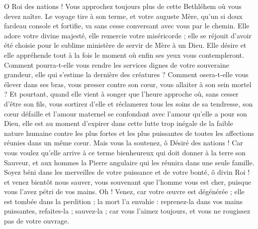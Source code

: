\documentclass[%
fontsize=10%
,a6paper%
,DIV=15%
]{scrartcl}
\begin{document}
O Roi des nations ! Vous approchez toujours plus de cette Bethléhem où vous devez naître. Le voyage tire à son terme, et votre auguste Mère, qu’un si doux fardeau console et fortifie, va sans cesse conversant avec vous par le chemin. Elle adore votre divine majesté, elle remercie votre miséricorde ; elle se réjouit d’avoir été choisie pour le sublime ministère de servir de Mère à un Dieu. Elle désire et elle appréhende tout à la fois le moment où enfin ses yeux vous contempleront. Comment pourra-t-elle vous rendre les services dignes de votre souveraine grandeur, elle qui s’estime la dernière des créatures ? Comment osera-t-elle vous élever dans ses bras, vous presser contre son cœur, vous allaiter à son sein mortel ? Et pourtant, quand elle vient à songer que l’heure approche où, sans cesser d’être son fils, vous sortirez d’elle et réclamerez tous les soins de sa tendresse, son cœur défaille et l’amour maternel se confondant avec l’amour qu’elle a pour son Dieu, elle est au moment d’expirer dans cette lutte trop inégale de la faible nature humaine contre les plus fortes et les plus puissantes de toutes les affections réunies dans un même cœur. Mais vous la soutenez, ô Désiré des nations ! Car vous voulez qu’elle arrive à ce terme bienheureux qui doit donner à la terre son Sauveur, et aux hommes la Pierre angulaire qui les réunira dans une seule famille. Soyez béni dans les merveilles de votre puissance et de votre bonté, ô divin Roi ! et venez bientôt nous sauver, vous souvenant que l’homme vous est cher, puisque vous l’avez pétri de vos mains. Oh ! Venez, car votre œuvre est dégénérée ; elle est tombée dans la perdition ; la mort l’a envahie : reprenez-la dans vos mains puissantes, refaites-la ; sauvez-la ; car vous l’aimez toujours, et vous ne rougissez pas de votre ouvrage.

\end{document}
